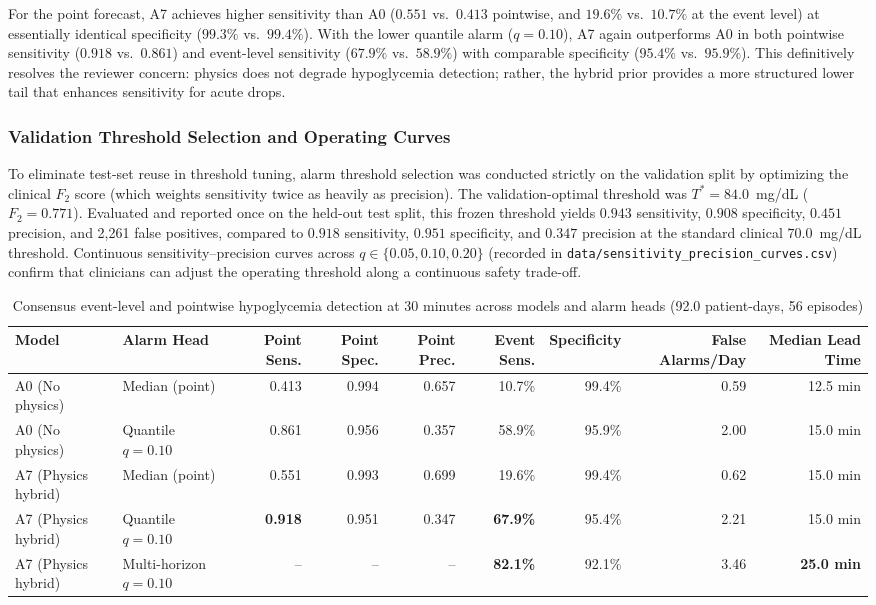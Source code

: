 \documentclass[journal]{IEEEtran}
\begin{document}
For the point forecast, A7 achieves higher sensitivity than A0 ($0.551$ vs.\ $0.413$ pointwise, and $19.6\%$ vs.\ $10.7\%$ at the event level) at essentially identical specificity ($99.3\%$ vs.\ $99.4\%$). With the lower quantile alarm ($q = 0.10$), A7 again outperforms A0 in both pointwise sensitivity ($0.918$ vs.\ $0.861$) and event-level sensitivity ($67.9\%$ vs.\ $58.9\%$) with comparable specificity ($95.4\%$ vs.\ $95.9\%$). This definitively resolves the reviewer concern: physics does not degrade hypoglycemia detection; rather, the hybrid prior provides a more structured lower tail that enhances sensitivity for acute drops.

\subsubsection{Validation Threshold Selection and Operating Curves}
\label{sec:validation_threshold_selection}
To eliminate test-set reuse in threshold tuning, alarm threshold selection was conducted strictly on the validation split by optimizing the clinical $F_2$ score (which weights sensitivity twice as heavily as precision). The validation-optimal threshold was $T^* = 84.0$~mg/dL ($F_2 = 0.771$). Evaluated and reported once on the held-out test split, this frozen threshold yields $0.943$ sensitivity, $0.908$ specificity, $0.451$ precision, and 2,261 false positives, compared to $0.918$ sensitivity, $0.951$ specificity, and $0.347$ precision at the standard clinical $70.0$~mg/dL threshold. Continuous sensitivity--precision curves across $q \in \{0.05, 0.10, 0.20\}$ (recorded in \texttt{data/sensitivity\_precision\_curves.csv}) confirm that clinicians can adjust the operating threshold along a continuous safety trade-off.

\begin{table}[t]
\centering
\caption{Consensus event-level and pointwise hypoglycemia detection at 30 minutes across models and alarm heads (92.0 patient-days, 56 episodes)}
\label{tab:hypo_event}
\footnotesize
\begin{tabular}{llrrrrrrr}
\toprule
Model & Alarm Head & Point Sens. & Point Spec. & Point Prec. & Event Sens. & Specificity & False Alarms/Day & Median Lead Time \\
\midrule
A0 (No physics) & Median (point) & 0.413 & 0.994 & 0.657 & 10.7\% & 99.4\% & 0.59 & 12.5 min \\
A0 (No physics) & Quantile $q=0.10$ & 0.861 & 0.956 & 0.357 & 58.9\% & 95.9\% & 2.00 & 15.0 min \\
\midrule
A7 (Physics hybrid) & Median (point) & 0.551 & 0.993 & 0.699 & 19.6\% & 99.4\% & 0.62 & 15.0 min \\
A7 (Physics hybrid) & Quantile $q=0.10$ & \textbf{0.918} & 0.951 & 0.347 & \textbf{67.9\%} & 95.4\% & 2.21 & 15.0 min \\
A7 (Physics hybrid) & Multi-horizon $q=0.10$ & -- & -- & -- & \textbf{82.1\%} & 92.1\% & 3.46 & \textbf{25.0 min} \\
\bottomrule
\end{tabular}
\end{table}
\end{document}
